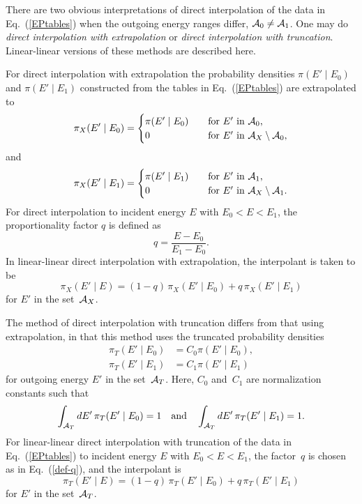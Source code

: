 There are two obvious interpretations of direct interpolation of
the data in Eq.~(\ref{EPtables}) when the outgoing energy ranges
differ, ${\cal A}_0 \ne {\cal A}_1$.  One may do \textit{direct interpolation
with extrapolation} or \textit{direct interpolation
with truncation}.   Linear-linear versions of these methods are
described here. 

For direct interpolation with extrapolation the probability densities
$\pi(E' \mid E_0 )$ and $\pi(E' \mid E_1 )$ constructed from the
tables in Eq.~(\ref{EPtables})  are extrapolated to
\begin{equation}
  \pi_X(E' \mid E_0 ) = \begin{cases}
    \pi(E' \mid E_0 ) &\quad \text{for $E'$ in ${\cal A}_0$,} \\
    0 &\quad \text{for $E'$ in ${\cal A}_X \setminus {\cal A}_0$,}
  \end{cases}
  \label{def-pi-X0}
\end{equation}
and
\begin{equation}
  \pi_X(E' \mid E_1 ) = \begin{cases}
    \pi(E' \mid E_1 ) &\quad \text{for $E'$ in ${\cal A}_1$,} \\
    0 &\quad \text{for $E'$ in ${\cal A}_X \setminus {\cal A}_1$.}
  \end{cases}
  \label{def-pi-X1}
\end{equation}
For direct interpolation
to incident energy $E$ with $E_0 < E < E_1$,
the proportionality factor $q$ is  defined as
\begin{equation}
  q = \frac{ E - E_0}{ E_1 - E_0 }.
  \label{def-q}
\end{equation}
In linear-linear direct interpolation with extrapolation,
the interpolant is taken to be
\begin{equation}
  \pi_X(E' \mid E ) = ( 1 - q )\, \pi_X(E' \mid E_0 ) + q\, \pi_X(E' \mid E_1 )
  \label{def-pi-X}
\end{equation}
for $E'$ in the set~${\cal A}_X$.

The method of direct interpolation with truncation differs from
that using extrapolation, in that this method uses the truncated
probability densities
\begin{equation}
 \begin{split}
   \pi_T(E' \mid E_0 )& = C_0 \pi(E' \mid E_0 ), \\
   \pi_T(E' \mid E_1 )& = C_1 \pi(E' \mid E_1 )
  \end{split}
 \label{def-pi-T01}
\end{equation}
for outgoing energy $E'$ in the set~${\cal A}_T$.  Here, $C_0$ 
and~$C_1$ are normalization constants such that
$$
   \int_{{\cal A}_T} dE' \, \pi_T(E' \mid E_0 ) = 1
   \quad \text{and} \quad
   \int_{{\cal A}_T} dE' \, \pi_T(E' \mid E_1 ) = 1.
$$
For linear-linear direct interpolation with truncation of the data in Eq.~(\ref{EPtables})
to incident energy $E$ with $E_0 < E < E_1$, the factor~$q$
is chosen as in Eq.~(\ref{def-q}), and the interpolant is
$$
  \pi_T(E' \mid E ) = ( 1 - q )\, \pi_T(E' \mid E_0 ) + q\, \pi_T(E' \mid E_1 )
$$
for $E'$ in the set~${\cal A}_T$.

